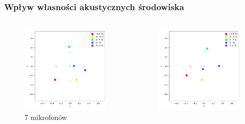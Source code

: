 \begin{frame}{}
    \frametitle{Wpływ własności akustycznych środowiska}
    \begin{columns}
        \begin{column}{0.5\textwidth}
            \begin{figure}
                \centering
                \includegraphics[width=\textwidth]{../pics/mult_lat_2d_num/positions_7_mean.png}
                \caption{7 mikrofonów}
            \end{figure}
        \end{column}
        \begin{column}{0.5\textwidth}
            \begin{figure}
                \centering
                \includegraphics[width=\textwidth]{../pics/mult_lat_2d_num/positions_8_mean.png}

\end{figure}
\end{column}
\end{columns}
\end{frame}
